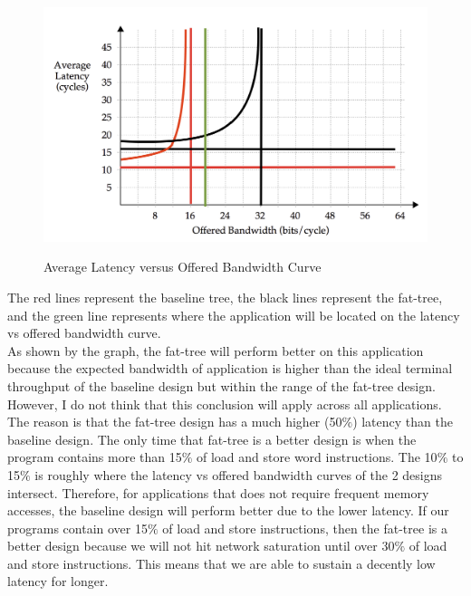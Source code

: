 \documentclass[10pt]{article}
\begin{document}
\begin{figure}[H]
\begin{center}
\includegraphics[scale=1]{graph.png}
\label{default}
\end{center}
\caption{Average Latency versus Offered Bandwidth Curve}
\end{figure}

The red lines represent the baseline tree, the black lines represent the fat-tree, and the green line represents where the application will be located on the latency vs offered bandwidth curve.\\

As shown by the graph, the fat-tree will perform better on this application because the expected bandwidth of application is higher than the ideal terminal throughput of the baseline design but within the range of the fat-tree design.\\

However, I do not think that this conclusion will apply across all applications. The reason is that the fat-tree design has a much higher (50$\%$) latency than the baseline design. The only time that fat-tree is a better design is when the program contains more than 15$\%$ of load and store word instructions. The 10$\%$ to 15$\%$ is roughly where the latency vs offered bandwidth curves of the 2 designs intersect. Therefore, for applications that does not require frequent memory accesses, the baseline design will perform better due to the lower latency. If our programs contain over 15$\%$ of load and store instructions, then the fat-tree is a better design because we will not hit network saturation until over 30$\%$ of load and store instructions. This means that we are able to sustain a decently low latency for longer. 
\end{document}
